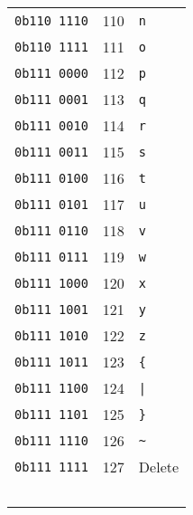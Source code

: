 {\begin{tabular}{c|r|l}
    \texttt{0b110 1110} & 110& \texttt{n} \\
    \texttt{0b110 1111} & 111& \texttt{o} \\
    \texttt{0b111 0000} & 112& \texttt{p} \\
    \texttt{0b111 0001} & 113& \texttt{q} \\
    \texttt{0b111 0010} & 114& \texttt{r} \\
    \texttt{0b111 0011} & 115& \texttt{s} \\
    \texttt{0b111 0100} & 116& \texttt{t} \\
    \texttt{0b111 0101} & 117& \texttt{u} \\
    \texttt{0b111 0110} & 118& \texttt{v} \\
    \texttt{0b111 0111} & 119& \texttt{w} \\
    \texttt{0b111 1000} & 120& \texttt{x} \\
    \texttt{0b111 1001} & 121& \texttt{y} \\
    \texttt{0b111 1010} & 122& \texttt{z} \\
    \texttt{0b111 1011} & 123& \texttt{\{} \\
      \texttt{0b111 1100} & 124& \texttt{|} \\
      \texttt{0b111 1101} & 125& \texttt{\}} \\
    \texttt{0b111 1110} & 126& \texttt{\textasciitilde} \\
    \texttt{0b111 1111} & 127& Delete \\
    ~ & ~ & ~\\
\end{tabular}

}